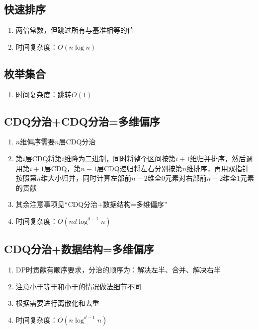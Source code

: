 \documentclass[twocolumn,a4,8pt]{article}  %
\begin{document}
	 	\subsection{快速排序}
			\noindent\begin{enumerate}
				\item 两倍常数，但跳过所有与基准相等的值
				\item 时间复杂度：$O(n\log n)$
			\end{enumerate}
	 	 	
	 	 	
 	 	\subsection{枚举集合}
			\noindent\begin{enumerate}
				\item 时间复杂度：跳转$O(1)$
			\end{enumerate}
	 	 	
	 	 	
	 	\subsection{CDQ分治+CDQ分治=多维偏序}
			\noindent\begin{enumerate}
				\item $n$维偏序需要$n$层CDQ分治
				\item 第$i$层CDQ将第$i$维降为二进制，同时将整个区间按第$i+1$维归并排序，然后调用第$i+1$层CDQ，第$n-1$层CDQ递归将左右分别按第$n$维排序，再用双指针按照第$n$维大小归并，同时计算左部前$n-2$维全$0$元素对右部前$n-2$维全$1$元素的贡献
				\item 其余注意事项见“CDQ分治+数据结构=多维偏序”
				\item 时间复杂度：$O(nd\log^{d-1}n)$
			\end{enumerate}
	 	 	

		\subsection{CDQ分治+数据结构=多维偏序}
			\noindent\begin{enumerate}
				\item DP时贡献有顺序要求，分治的顺序为：解决左半、合并、解决右半
				\item 注意小于等于和小于的情况做法细节不同
				\item 根据需要进行离散化和去重
				\item 时间复杂度：$O(n\log^{d-1}n)$
			\end{enumerate}
	 	 	
	
\end{document}
